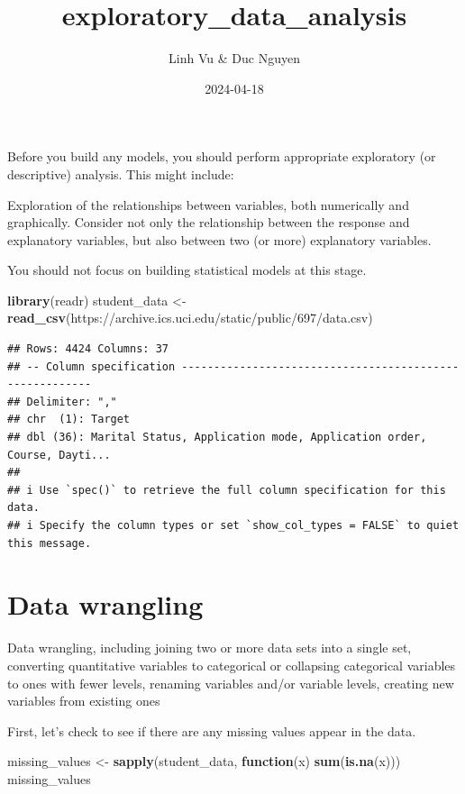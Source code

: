 \documentclass[
]{article}
\title{exploratory\_data\_analysis}
\author{Linh Vu \& Duc Nguyen}
\date{2024-04-18}
\newenvironment{Shaded}{\begin{snugshade}}{\end{snugshade}}
\newcommand{\ControlFlowTok}[1]{\textcolor[rgb]{0.13,0.29,0.53}{\textbf{#1}}}
\newcommand{\FunctionTok}[1]{\textcolor[rgb]{0.13,0.29,0.53}{\textbf{#1}}}
\newcommand{\NormalTok}[1]{#1}
\newcommand{\OtherTok}[1]{\textcolor[rgb]{0.56,0.35,0.01}{#1}}
\newcommand{\StringTok}[1]{\textcolor[rgb]{0.31,0.60,0.02}{#1}}
\begin{document}
\maketitle

Before you build any models, you should perform appropriate exploratory
(or descriptive) analysis. This might include:

Exploration of the relationships between variables, both numerically and
graphically. Consider not only the relationship between the response and
explanatory variables, but also between two (or more) explanatory
variables.

You should not focus on building statistical models at this stage.

\begin{Shaded}
\begin{Highlighting}[]
\FunctionTok{library}\NormalTok{(readr)}
\NormalTok{student\_data }\OtherTok{\textless{}{-}} \FunctionTok{read\_csv}\NormalTok{(}\StringTok{\textquotesingle{}https://archive.ics.uci.edu/static/public/697/data.csv\textquotesingle{}}\NormalTok{)}
\end{Highlighting}
\end{Shaded}

\begin{verbatim}
## Rows: 4424 Columns: 37
## -- Column specification --------------------------------------------------------
## Delimiter: ","
## chr  (1): Target
## dbl (36): Marital Status, Application mode, Application order, Course, Dayti...
## 
## i Use `spec()` to retrieve the full column specification for this data.
## i Specify the column types or set `show_col_types = FALSE` to quiet this message.
\end{verbatim}

\hypertarget{data-wrangling}{%
\section{Data wrangling}\label{data-wrangling}}

Data wrangling, including joining two or more data sets into a single
set, converting quantitative variables to categorical or collapsing
categorical variables to ones with fewer levels, renaming variables
and/or variable levels, creating new variables from existing ones

First, let's check to see if there are any missing values appear in the
data.

\begin{Shaded}
\begin{Highlighting}[]
\NormalTok{missing\_values }\OtherTok{\textless{}{-}} \FunctionTok{sapply}\NormalTok{(student\_data, }\ControlFlowTok{function}\NormalTok{(x) }\FunctionTok{sum}\NormalTok{(}\FunctionTok{is.na}\NormalTok{(x)))}
\NormalTok{missing\_values}
\end{Highlighting}
\end{Shaded}
\end{document}
